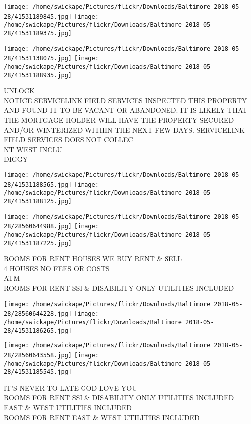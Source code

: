 \documentclass[10pt,letterpaper]{article}
\begin{document}
\texttt{[image: /home/swickape/Pictures/flickr/Downloads/Baltimore 2018-05-28/41531189845.jpg]}
\texttt{[image: /home/swickape/Pictures/flickr/Downloads/Baltimore 2018-05-28/41531189375.jpg]}

\texttt{[image: /home/swickape/Pictures/flickr/Downloads/Baltimore 2018-05-28/41531138075.jpg]}
\texttt{[image: /home/swickape/Pictures/flickr/Downloads/Baltimore 2018-05-28/41531188935.jpg]}

UNLOCK\\
NOTICE SERVICELINK FIELD SERVICES INSPECTED THIS PROPERTY AND FOUND IT TO BE VACANT OR ABANDONED.  IT IS LIKELY THAT THE MORTGAGE HOLDER WILL HAVE THE PROPERTY SECURED AND/OR WINTERIZED WITHIN THE NEXT FEW DAYS.  SERVICELINK FIELD SERVICES DOES NOT COLLEC\\
NT WEST INCLU\\
DIGGY\\
\pagebreak

\texttt{[image: /home/swickape/Pictures/flickr/Downloads/Baltimore 2018-05-28/41531188565.jpg]}
\texttt{[image: /home/swickape/Pictures/flickr/Downloads/Baltimore 2018-05-28/41531188125.jpg]}

\texttt{[image: /home/swickape/Pictures/flickr/Downloads/Baltimore 2018-05-28/28560644988.jpg]}
\texttt{[image: /home/swickape/Pictures/flickr/Downloads/Baltimore 2018-05-28/41531187225.jpg]}

ROOMS FOR RENT HOUSES WE BUY RENT \& SELL\\
4 HOUSES NO FEES OR COSTS\\
ATM\\
ROOMS FOR RENT SSI \& DISABILITY ONLY UTILITIES INCLUDED\\
\pagebreak

\texttt{[image: /home/swickape/Pictures/flickr/Downloads/Baltimore 2018-05-28/28560644228.jpg]}
\texttt{[image: /home/swickape/Pictures/flickr/Downloads/Baltimore 2018-05-28/41531186265.jpg]}

\texttt{[image: /home/swickape/Pictures/flickr/Downloads/Baltimore 2018-05-28/28560643558.jpg]}
\texttt{[image: /home/swickape/Pictures/flickr/Downloads/Baltimore 2018-05-28/41531185545.jpg]}

IT'S NEVER TO LATE GOD LOVE YOU\\
ROOMS FOR RENT SSI \& DISABILITY ONLY UTILITIES INCLUDED\\
EAST \& WEST UTILITIES INCLUDED\\
ROOMS FOR RENT EAST \& WEST UTILITIES INCLUDED\\
\pagebreak
\end{document}

